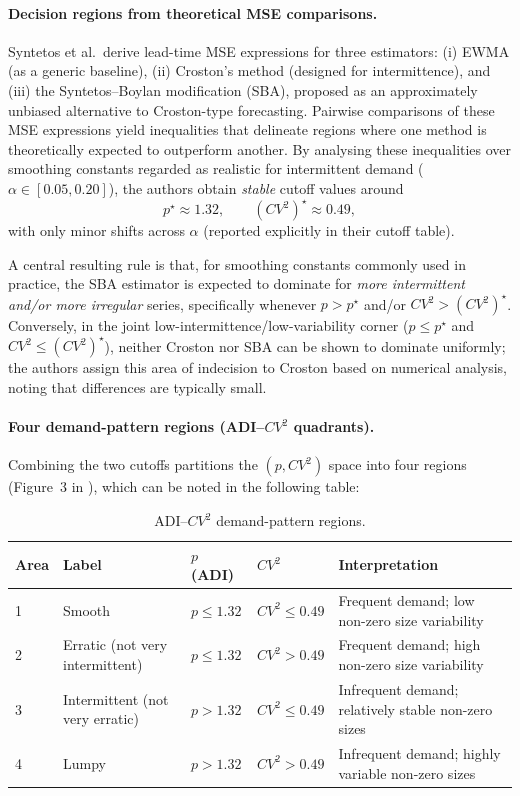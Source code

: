 \paragraph{Decision regions from theoretical MSE comparisons.}
Syntetos et al.\ derive lead-time MSE expressions for three estimators: (i) EWMA (as a generic baseline), (ii) Croston's method (designed for intermittence), and (iii) the Syntetos--Boylan modification (SBA), proposed as an approximately unbiased alternative to Croston-type forecasting.
Pairwise comparisons of these MSE expressions yield inequalities that delineate regions where one method is theoretically expected to outperform another.
By analysing these inequalities over smoothing constants regarded as realistic for intermittent demand ($\alpha \in [0.05,0.20]$), the authors obtain \emph{stable} cutoff values around
\[
p^\star \approx 1.32,\qquad (CV^2)^\star \approx 0.49,
\]
with only minor shifts across $\alpha$ (reported explicitly in their cutoff table).

A central resulting rule is that, for smoothing constants commonly used in practice, the SBA estimator is expected to dominate for \emph{more intermittent and/or more irregular} series, specifically whenever $p>p^\star$ and/or $CV^2>(CV^2)^\star$. Conversely, in the joint low-intermittence/low-variability corner ($p\le p^\star$ and $CV^2\le (CV^2)^\star$), neither Croston nor SBA can be shown to dominate uniformly; the authors assign this area of indecision to Croston based on numerical analysis, noting that differences are typically small.

\paragraph{Four demand-pattern regions (ADI--$CV^2$ quadrants).}
Combining the two cutoffs partitions the $(p, CV^2)$ space into four regions (Figure~3 in \cite{syntetos2005}), which 
can be noted in the following table:
\begin{table}[h]
\centering
\caption{ADI--$CV^2$ demand-pattern regions.}
\label{tab:adi-cv2-regions}
\begin{tabular}{lllll}
\toprule
\textbf{Area} & \textbf{Label} & \textbf{$p$ (ADI)} & \textbf{$CV^2$} & \textbf{Interpretation} \\
\midrule
1 & Smooth & $p \le 1.32$ & $CV^2 \le 0.49$ & Frequent demand; low non-zero size variability \\
2 & Erratic (not very intermittent) & $p \le 1.32$ & $CV^2 > 0.49$ & Frequent demand; high non-zero size variability \\
3 & Intermittent (not very erratic) & $p > 1.32$ & $CV^2 \le 0.49$ & Infrequent demand; relatively stable non-zero sizes \\
4 & Lumpy & $p > 1.32$ & $CV^2 > 0.49$ & Infrequent demand; highly variable non-zero sizes \\
\bottomrule
\end{tabular}
\end{table}

